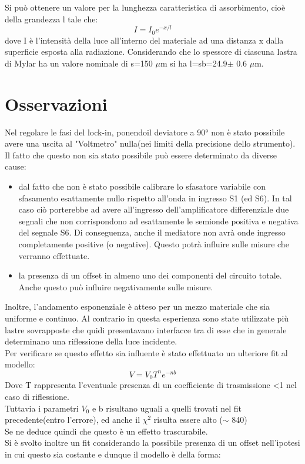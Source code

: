 Si può ottenere un valore per la lunghezza caratteristica di assorbimento, cioè della grandezza l tale che:
\begin{equation}
I=I_{0}e^{-x/l}
\end{equation}
dove I è l'intensità della luce all'interno del materiale ad una distanza x dalla superficie esposta alla radiazione.
Considerando che lo spessore di ciascuna lastra di Mylar ha un valore nominale di s=150 $\mu$m si ha l=sb=24.9$ \pm$ 0.6 $\mu$m.

\section{Osservazioni}
Nel regolare le fasi del lock-in, ponendoil deviatore a 90° non è stato possibile avere una uscita al "Voltmetro" nulla(nei limiti della precisione dello strumento).\\
Il fatto che questo non sia stato possibile può essere determinato da diverse cause:
\begin{itemize}
\item dal fatto che non è stato possibile calibrare lo sfasatore variabile con sfasamento esattamente nullo rispetto all'onda in ingresso S1 (ed S6).
In tal caso ciò porterebbe ad avere all'ingresso dell'amplificatore differenziale due segnali che non corrispondono ad esattamente le semionde positiva e negativa del segnale S6. Di conseguenza, anche il mediatore non avrà onde ingresso completamente positive (o negative). Questo potrà influire sulle misure che verranno effettuate.\\
\item la presenza di un offset in almeno uno dei componenti del circuito totale. Anche questo può influire negativamente sulle misure.
\end{itemize} 
Inoltre, l'andamento esponenziale è atteso per un mezzo materiale che sia uniforme e continuo. Al contrario in questa esperienza sono state utilizzate più lastre sovrapposte che quidi presentavano interfacce tra di esse che in generale determinano una riflessione della luce incidente.\\
Per verificare se questo effetto sia influente è stato effettuato un ulteriore fit al modello:
\begin{equation}
V=V_{0}T^{n}e^{-nb}
\end{equation}
Dove T rappresenta l'eventuale presenza di un coefficiente di trasmissione <1 nel caso di riflessione.\\
Tuttavia i parametri $V_{0}$ e b risultano uguali a quelli trovati nel fit precedente(entro l'errore), ed anche il $\chi^{2}$ risulta essere alto ($\sim$ 840)\\
Se ne deduce quindi che questo è un effetto trascurabile.\\
Si è svolto inoltre un fit considerando la possibile presenza di un offset nell'ipotesi in cui questo sia costante e dunque il modello è della forma:

